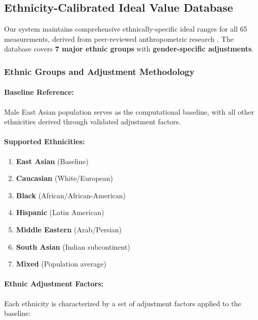 \subsection{Ethnicity-Calibrated Ideal Value Database}

Our system maintains comprehensive ethnically-specific ideal ranges for all 65 measurements, derived from peer-reviewed anthropometric research \cite{farkas1994, legan1980, arnett1999}. The database covers \textbf{7 major ethnic groups} with \textbf{gender-specific adjustments}.

\subsubsection{Ethnic Groups and Adjustment Methodology}

\paragraph{Baseline Reference:} Male East Asian population serves as the computational baseline, with all other ethnicities derived through validated adjustment factors.

\paragraph{Supported Ethnicities:}
\begin{enumerate}
    \item \textbf{East Asian} (Baseline)
    \item \textbf{Caucasian} (White/European)
    \item \textbf{Black} (African/African-American)
    \item \textbf{Hispanic} (Latin American)
    \item \textbf{Middle Eastern} (Arab/Persian)
    \item \textbf{South Asian} (Indian subcontinent)
    \item \textbf{Mixed} (Population average)
\end{enumerate}

\paragraph{Ethnic Adjustment Factors:}

Each ethnicity is characterized by a set of adjustment factors applied to the baseline:

